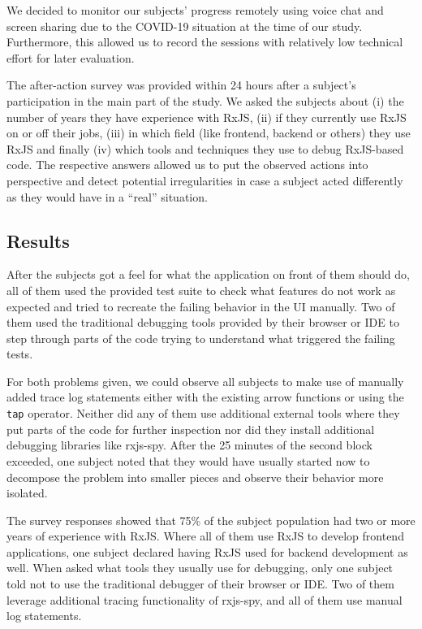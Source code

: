 \documentclass[12pt,a4paper]{article}
\begin{document}
We decided to monitor our subjects' progress remotely using voice chat and screen sharing due to the COVID-19 situation at the time of our study. Furthermore, this allowed us to record the sessions with relatively low technical effort for later evaluation.

The after-action survey was provided within 24 hours after a subject's participation in the main part of the study. We asked the subjects about (i) the number of years they have experience with RxJS, (ii) if they currently use RxJS on or off their jobs, (iii) in which field (like frontend, backend or others) they use RxJS and finally (iv) which tools and techniques they use to debug RxJS-based code. The respective answers allowed us to put the observed actions into perspective and detect potential irregularities in case a subject acted differently as they would have in a ``real'' situation.

\subsection{Results}

After the subjects got a feel for what the application on front of them should do, all of them used the provided test suite to check what features do not work as expected and tried to recreate the failing behavior in the UI manually. Two of them used the traditional debugging tools provided by their browser or IDE to step through parts of the code trying to understand what triggered the failing tests.

For both problems given, we could observe all subjects to make use of manually added trace log statements either with the existing arrow functions or using the \texttt{tap} operator. Neither did any of them use additional external tools where they put parts of the code for further inspection nor did they install additional debugging libraries like rxjs-spy.
After the 25 minutes of the second block exceeded, one subject noted that they would have usually started now to decompose the problem into smaller pieces and observe their behavior more isolated.

The survey responses showed that 75\% of the subject population had two or more years of experience with RxJS. Where all of them use RxJS to develop frontend applications, one subject declared having RxJS used for backend development as well. When asked what tools they usually use for debugging, only one subject told not to use the traditional debugger of their browser or IDE. Two of them leverage additional tracing functionality of rxjs-spy, and all of them use manual log statements.
\end{document}
